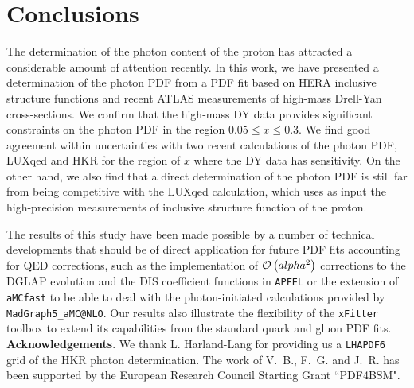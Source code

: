 \section{Conclusions}

\label{sec:conclusions}

The determination of the photon content of the proton has
attracted a considerable amount of attention recently.
%
In this work, we have presented a determination of the photon PDF from
a PDF fit based on HERA inclusive structure functions and recent ATLAS measurements
of high-mass Drell-Yan cross-sections.
%
We confirm that the high-mass DY data provides significant constraints on the photon PDF
in the region $0.05 \le x \le 0.3$.
%
We find good agreement within uncertainties with two recent calculations of the photon PDF,
LUXqed and HKR for the region of $x$ where the DY data has sensitivity.
%
On the other hand, we also find that a direct determination of the photon PDF
is still far from being competitive with the LUXqed calculation, which uses as input
the high-precision measurements of inclusive structure function of the proton.

The results of this study have been made possible by a number of technical developments
that should be of direct application for future PDF fits accounting for QED corrections,
such as the implementation of $\mathcal{O}\left( alpha^2\right)$ corrections to the DGLAP
evolution and the DIS coefficient functions in {\tt APFEL} or the extension of
{\tt aMCfast} to be able to deal with the photon-initiated calculations provided
by {\tt MadGraph5\_aMC@NLO}.
%
Our results also illustrate the flexibility of the {\tt xFitter} toolbox to extend
its capabilities from the standard quark and gluon PDF fits.\\


{\bf Acknowledgements}.
%
We thank L. Harland-Lang for providing us a {\tt LHAPDF6} grid
of the HKR photon determination.
%
The work of V.~B., F.~G. and J.~R. has been supported
by the European Research Council Starting Grant ``PDF4BSM".



